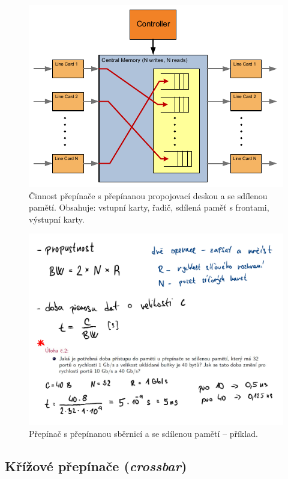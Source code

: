 \begin{figure}[H]
    \centering
    \includegraphics[width=1\linewidth]{prepinana_deska_sdilena_pamet.pdf}
    \caption{Činnost přepínače s přepínanou propojovací deskou a se sdílenou pamětí. Obsahuje: vstupní karty, řadič, sdílená paměť s frontami, výstupní karty.}
\end{figure}

\begin{figure}[H]
    \centering
    \includegraphics[width=0.9\linewidth]{prepinana_deska_sdilena_pamet_priklad.pdf}
    \caption{Přepínač s přepínanou sběrnicí a se sdílenou pamětí -- příklad.}
\end{figure}

\subsection{Křížové přepínače (\textit{crossbar})}

